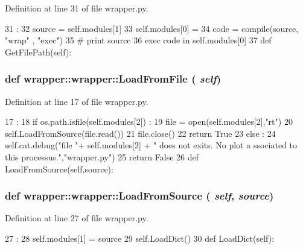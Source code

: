 Definition at line 31 of file wrapper.py.


\begin{DoxyCode}
31                       :
32         source = self.modules[1]
33         self.modules[0] = {}
34         code = compile(source, "wrap" , "exec")
35 #        print source
36         exec code in self.modules[0]
37 
    def GetFilePath(self):
\end{DoxyCode}
\hypertarget{classwrapper_1_1wrapper_ab315783e7a986b3e53d41877e3c41620}{
\subsubsection[{LoadFromFile}]{\setlength{\rightskip}{0pt plus 5cm}def wrapper::wrapper::LoadFromFile ( {\em self})}}
\label{classwrapper_1_1wrapper_ab315783e7a986b3e53d41877e3c41620}


Definition at line 17 of file wrapper.py.


\begin{DoxyCode}
17                           :
18         if os.path.isfile(self.modules[2]) :
19             file = open(self.modules[2],"rt")
20             self.LoadFromSource(file.read())
21             file.close()
22             return True
23         else :
24             self.cat.debug("file "+ self.modules[2] + " does not exits. No plot a
      ssociated to this processus.","wrapper.py")
25             return False
26 
    def LoadFromSource(self,source):
\end{DoxyCode}
\hypertarget{classwrapper_1_1wrapper_ae63461400283e16ea7d67219f8a397da}{
\subsubsection[{LoadFromSource}]{\setlength{\rightskip}{0pt plus 5cm}def wrapper::wrapper::LoadFromSource ( {\em self}, \/   {\em source})}}
\label{classwrapper_1_1wrapper_ae63461400283e16ea7d67219f8a397da}


Definition at line 27 of file wrapper.py.


\begin{DoxyCode}
27                                    :
28         self.modules[1] = source
29         self.LoadDict()
30 
    def LoadDict(self):
\end{DoxyCode}


